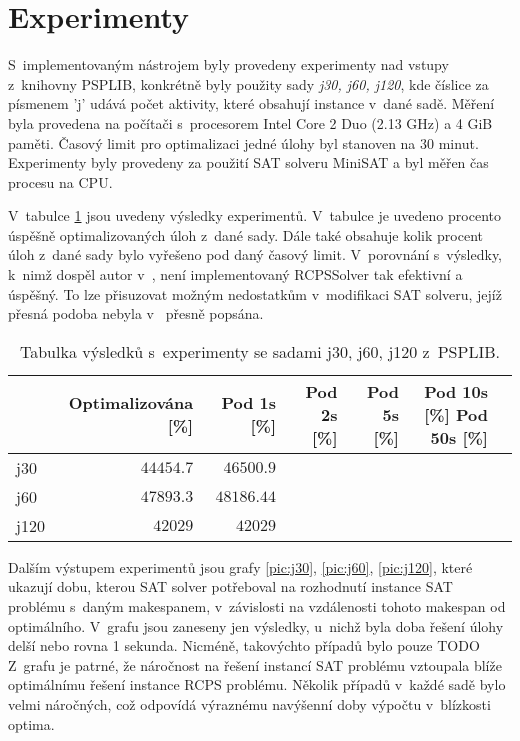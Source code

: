 \documentclass[a4paper, 12pt]{article}
\begin{document}
\section{Experimenty}
S~implementovaným nástrojem byly provedeny experimenty nad vstupy
z~knihovny PSPLIB, konkrétně byly použity sady \emph{j30, j60, j120}, kde
číslice za písmenem 'j' udává počet aktivity, které obsahují instance v~dané sadě.
Měření byla provedena na počítači s~procesorem Intel Core 2 Duo (2.13 GHz) a 4 GiB paměti.
Časový limit pro optimalizaci jedné úlohy byl stanoven na $30$ minut.
Experimenty byly provedeny za použití SAT solveru MiniSAT a byl měřen čas
procesu na CPU.

V~tabulce \ref{table:jreses} jsou uvedeny výsledky experimentů.
V~tabulce je uvedeno procento úspěšně optimalizovaných úloh z~dané sady.
Dále také obsahuje kolik procent úloh z~dané sady bylo vyřešeno pod daný časový limit.
V~porovnání s~výsledky, k~nimž dospěl autor v~\cite{horbach:10}, není implementovaný
RCPSSolver tak efektivní a úspěšný.
To lze přisuzovat možným nedostatkům v~modifikaci SAT solveru, jejíž přesná podoba nebyla
v~\cite{horbach:10} přesně popsána.

\begin{table}[tb]
\begin{center}
  \begin{tabular}{ | l | r | r | r | r | r | r |}
   \hline
    & \textbf{Optimalizována [\%]} & Pod 1s [\%] & Pod 2s [\%] & Pod 5s [\%] & Pod 10s [\%] Pod 50s [\%]\\ \hline \hline
    j30 &$44454.7$ & $46500.9$ & & & \\ \hline
    j60 & $47893.3$ & $48186.44$ & & & \\ \hline
    j120 & $42 029$ & $42 029$ & & & \\ \hline
   \end{tabular}
   \caption{Tabulka výsledků s~experimenty se sadami j30, j60, j120 z~PSPLIB.}
   \label{table:jreses}
\end{center}
\end{table}

Dalším výstupem experimentů jsou grafy \ref{pic:j30}, \ref{pic:j60}, \ref{pic:j120},
které ukazují dobu, kterou SAT solver potřeboval na rozhodnutí instance SAT problému
s~daným makespanem, v~závislosti na vzdálenosti tohoto makespan od optimálního.
V~grafu jsou zaneseny jen výsledky, u~nichž byla doba řešení úlohy delší nebo rovna 1 sekunda.
Nicméně, takovýchto případů bylo pouze TODO
Z~grafu je patrné, že náročnost na řešení instancí SAT problému vztoupala blíže optimálnímu řešení instance RCPS problému.
Několik případů v~každé sadě bylo velmi náročných, což odpovídá výraznému navýšenní doby výpočtu v~blízkosti optima.
\end{document}
